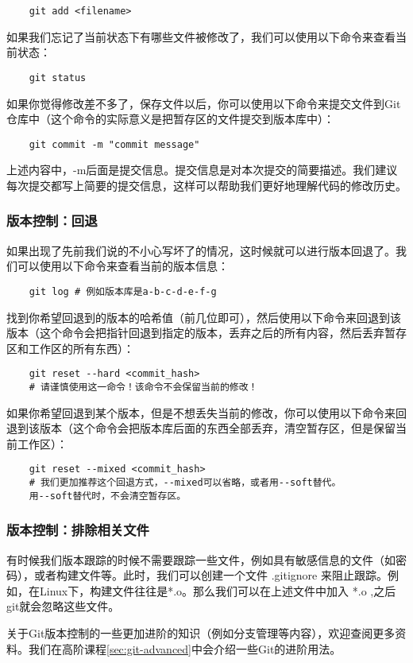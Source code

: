 \documentclass[../main.tex]{subfiles}
\begin{document}
\begin{verbatim}
    git add <filename>
\end{verbatim}

如果我们忘记了当前状态下有哪些文件被修改了，我们可以使用以下命令来查看当前状态：
\begin{verbatim}
    git status
\end{verbatim}

如果你觉得修改差不多了，保存文件以后，你可以使用以下命令来提交文件到Git仓库中（这个命令的实际意义是把暂存区的文件提交到版本库中）：

\begin{verbatim}
    git commit -m "commit message"
\end{verbatim}

上述内容中，-m后面是提交信息。提交信息是对本次提交的简要描述。我们建议每次提交都写上简要的提交信息，这样可以帮助我们更好地理解代码的修改历史。

\subsubsection{版本控制：回退}

如果出现了先前我们说的不小心写坏了的情况，这时候就可以进行版本回退了。我们可以使用以下命令来查看当前的版本信息：

\begin{verbatim}
    git log # 例如版本库是a-b-c-d-e-f-g
\end{verbatim}

找到你希望回退到的版本的哈希值（前几位即可），然后使用以下命令来回退到该版本（这个命令会把指针回退到指定的版本，丢弃之后的所有内容，然后丢弃暂存区和工作区的所有东西）：

\begin{verbatim}
    git reset --hard <commit_hash> 
    # 请谨慎使用这一命令！该命令不会保留当前的修改！
\end{verbatim}

如果你希望回退到某个版本，但是不想丢失当前的修改，你可以使用以下命令来回退到该版本（这个命令会把版本库后面的东西全部丢弃，清空暂存区，但是保留当前工作区）：
\begin{verbatim}
    git reset --mixed <commit_hash> 
    # 我们更加推荐这个回退方式，--mixed可以省略，或者用--soft替代。
    用--soft替代时，不会清空暂存区。
\end{verbatim}

\subsubsection{版本控制：排除相关文件}

有时候我们版本跟踪的时候不需要跟踪一些文件，例如具有敏感信息的文件（如密码），或者构建文件等。此时，我们可以创建一个文件 .gitignore 来阻止跟踪。例如，在Linux下，构建文件往往是*.o。那么我们可以在上述文件中加入 *.o ,之后git就会忽略这些文件。

关于Git版本控制的一些更加进阶的知识（例如分支管理等内容），欢迎查阅更多资料。我们在高阶课程\ref{sec:git-advanced}中会介绍一些Git的进阶用法。
\end{document}

